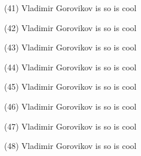 \documentclass{article}%
\begin{document}
\begin{minipage}{0.3333333333333333\textwidth}%
(41) Vladimir Gorovikov%
\newline%
%
is so%
\newline%
%
is cool%
\newline%
%
\end{minipage}%
\begin{minipage}{0.3333333333333333\textwidth}%
(42) Vladimir Gorovikov%
\newline%
%
is so%
\newline%
%
is cool%
\newline%
%
\end{minipage}%
\newline%
\begin{minipage}{0.3333333333333333\textwidth}%
(43) Vladimir Gorovikov%
\newline%
%
is so%
\newline%
%
is cool%
\newline%
%
\end{minipage}%
\begin{minipage}{0.3333333333333333\textwidth}%
(44) Vladimir Gorovikov%
\newline%
%
is so%
\newline%
%
is cool%
\newline%
%
\end{minipage}%
\begin{minipage}{0.3333333333333333\textwidth}%
(45) Vladimir Gorovikov%
\newline%
%
is so%
\newline%
%
is cool%
\newline%
%
\end{minipage}%
\newline%
\begin{minipage}{0.3333333333333333\textwidth}%
(46) Vladimir Gorovikov%
\newline%
%
is so%
\newline%
%
is cool%
\newline%
%
\end{minipage}%
\begin{minipage}{0.3333333333333333\textwidth}%
(47) Vladimir Gorovikov%
\newline%
%
is so%
\newline%
%
is cool%
\newline%
%
\end{minipage}%
\begin{minipage}{0.3333333333333333\textwidth}%
(48) Vladimir Gorovikov%
\newline%
%
is so%
\newline%
%
is cool%
\newline%
%
\end{minipage}%
\end{document}
